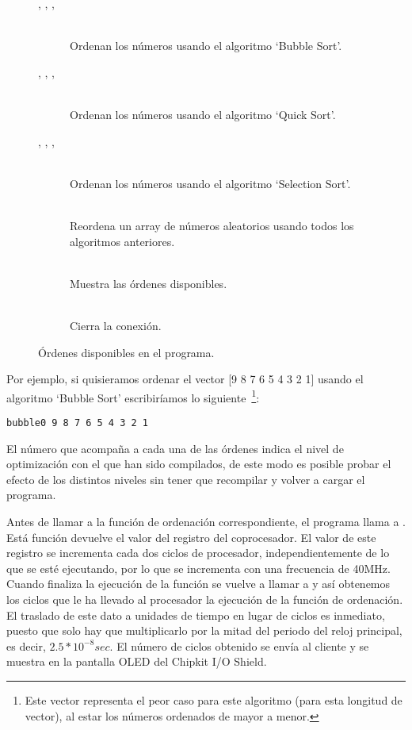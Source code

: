 \begin{figure}[htb]
\begin{description}
	\item[, , , ] \hfill \\
	 Ordenan los números usando el algoritmo `Bubble Sort'.
	\item[, , , ] \hfill \\
	 Ordenan los números usando el algoritmo `Quick Sort'.
	\item[, , , ] \hfill \\
	 Ordenan los números usando el algoritmo `Selection Sort'.
	\item[] \hfill \\
	 Reordena un array de números aleatorios usando todos los algoritmos anteriores.
	\item[] \hfill \\
	 Muestra las órdenes disponibles.
	\item[] \hfill \\
	 Cierra la conexión.
\end{description}
\caption{Órdenes disponibles en el programa.}
\label{sorted_ordenes}
\end{figure}

Por ejemplo, si quisieramos ordenar el vector [9 8 7 6 5 4 3 2 1] usando el algoritmo `Bubble Sort' escribiríamos lo siguiente~\footnote{Este vector representa el peor caso para este algoritmo (para esta longitud de vector), al estar los números ordenados de mayor a menor.}:
\begin{lstlisting}
bubble0 9 8 7 6 5 4 3 2 1
\end{lstlisting}

El número que acompaña a cada una de las órdenes indica el nivel de optimización con el que han sido compilados, de este modo es posible probar el efecto de los distintos niveles sin tener que recompilar y volver a cargar el programa. 

Antes de llamar a la función de ordenación correspondiente, el programa llama a . Está función devuelve el valor del registro  del coprocesador. El valor de este registro se incrementa cada dos ciclos de procesador, independientemente de lo que se esté ejecutando, por lo que se incrementa con una frecuencia de 40MHz. Cuando finaliza la ejecución de la función se vuelve a llamar a  y así obtenemos los ciclos que le ha llevado al procesador la ejecución de la función de ordenación. El traslado de este dato a unidades de tiempo en lugar de ciclos es inmediato, puesto que solo hay que multiplicarlo por la mitad del periodo del reloj principal, es decir, \(2.5*10^{-8}sec\).
El número de ciclos obtenido se envía al cliente y se muestra en la pantalla OLED del Chipkit I/O Shield.

